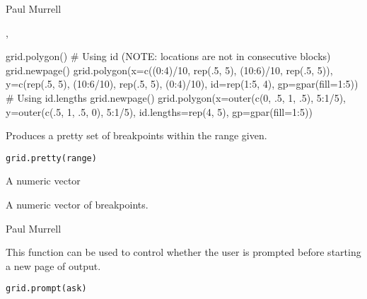 %
\begin{Author}\relax
Paul Murrell
\end{Author}
%
\begin{SeeAlso}\relax
{},
\end{SeeAlso}
%
\begin{Examples}
\begin{ExampleCode}
grid.polygon()
# Using id (NOTE: locations are not in consecutive blocks)
grid.newpage()
grid.polygon(x=c((0:4)/10, rep(.5, 5), (10:6)/10, rep(.5, 5)),
             y=c(rep(.5, 5), (10:6/10), rep(.5, 5), (0:4)/10),
             id=rep(1:5, 4),
             gp=gpar(fill=1:5))
# Using id.lengths
grid.newpage()
grid.polygon(x=outer(c(0, .5, 1, .5), 5:1/5),
             y=outer(c(.5, 1, .5, 0), 5:1/5),
             id.lengths=rep(4, 5),
             gp=gpar(fill=1:5))
\end{ExampleCode}
\end{Examples}
%
\begin{Description}\relax
Produces a pretty set of breakpoints within the range given.
\end{Description}
%
\begin{Usage}
\begin{verbatim}
grid.pretty(range)
\end{verbatim}
\end{Usage}
%
\begin{Arguments}
\begin{ldescription}
\item[\code{range}]  A numeric vector 
\end{ldescription}
\end{Arguments}
%
\begin{Value}
A numeric vector of breakpoints.
\end{Value}
%
\begin{Author}\relax
 Paul Murrell 
\end{Author}
%
\begin{Description}\relax
This function can be used to control whether the user
is prompted before starting a new page of output.
\end{Description}
%
\begin{Usage}
\begin{verbatim}
grid.prompt(ask)
\end{verbatim}
\end{Usage}
